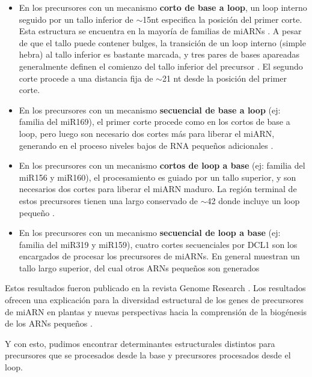 \begin{itemize}
    \item En los precursores con un mecanismo \textbf{corto de base a loop}, un loop interno seguido por un tallo inferior de $\sim$15nt especifica la posición del primer corte.
        Esta estructura se encuentra en la mayoría de familias de miARNs \citep{Mateos2010,pmid20015653,pmid20015654}.
        A pesar de que el tallo puede contener bulges, la transición de un loop interno (simple hebra) al tallo inferior es bastante marcada, y tres pares de bases apareadas generalmente definen el comienzo del tallo inferior del precursor \citep{Bologna2013}.
        El segundo corte procede a una distancia fija de $\sim$21 nt desde la posición del primer corte.
    \item En los precursores con un mecanismo \textbf{secuencial de base a loop} (ej: familia del miR169), el primer corte procede como en los cortos de base a loop, pero luego son necesario dos cortes más para liberar el miARN, generando en el proceso niveles bajos de RNA pequeños adicionales \citep{Bologna2013}.
    \item En los precursores con un mecanismo \textbf{cortos de loop a base} (ej: familia del miR156 y miR160), el procesamiento es guiado por un tallo superior, y son necesarios dos cortes para liberar el miARN maduro.
        La región terminal de estos precursores tienen una largo conservado de $\sim$42 donde incluye un loop pequeño \citep{Bologna2013}.
    \item En los precursores con un mecanismo \textbf{secuencial de loop a base} (ej: familia del miR319 y miR159), cuatro cortes secuenciales por DCL1 son los encargados de procesar los precursores de miARNs.
        En general muestran un tallo largo superior, del cual otros ARNs pequeños son generados \citep{pmid19850910,Bologna2009,Bologna2013}
\end{itemize}



Estos resultados fueron publicado en la revista Genome Research \citep{Bologna2013}.
Los resultados ofrecen una explicación para la diversidad estructural de los genes de precursores de miARN en plantas y nuevas perspectivas hacia la comprensión de la biogénesis de los ARNs pequeños \citep{Bologna2013}.

Y con esto, pudimos encontrar determinantes estructurales distintos para precursores que se procesados desde la base y precursores procesados desde el loop. 
